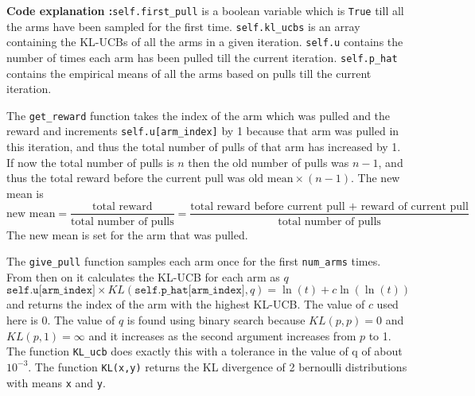 \documentclass[11pt]{article}
\begin{document}
    \noindent
    \textbf{Code explanation :}\texttt{self.first\_pull} is a boolean variable
    which is \texttt{True} till all the arms have been sampled for the first time.
     \texttt{self.kl\_ucbs} is an array containing
    the KL-UCBs of all the arms in a given iteration. \texttt{self.u} contains
    the number of times each arm has been pulled till the current iteration. 
    \texttt{self.p\_hat} contains the empirical means of all the arms
    based on pulls till the current iteration. 

    
    \noindent The \texttt{get\_reward} function
    takes the index of the arm which was pulled and the reward and increments 
    \texttt{self.u[arm\_index]} by 1 because that arm was pulled in this iteration, 
    and thus the total number of pulls of that arm has increased by 1. 
    If now the total number of pulls is $n$ then the old number of pulls was
    $n-1$, and thus the total reward before the current pull was 
    $\text{old mean}\times(n-1)$. The new mean is 
    $$\text{new mean} = \frac{\text{total reward}}{\text{total number of pulls}} = \frac{\text{total reward before current pull + reward of current pull}}{\text{total number of pulls}}$$
    The new mean is set for the arm that was pulled.

   \noindent The \texttt{give\_pull} function samples each arm once for the first \texttt{num\_arms} times. 
    From then on it calculates the KL-UCB for each arm as $q$ 
    $$\texttt{self.u[arm\_index]}\times KL(\texttt{self.p\_hat[arm\_index]}, q) = \ln(t) + c \ln(\ln(t))$$ and returns 
    the index of the arm with the highest KL-UCB. The value of $c$ used here is 0. The value of $q$ is
    found using binary search because $KL(p,p) = 0$ and $KL(p,1) = \infty$ and it increases as the second argument increases
    from $p$ to 1. The function \texttt{KL\_ucb} does exactly this with a tolerance in the value of q 
    of about $10^{-3}$. The function \texttt{KL(x,y)} returns the KL divergence of 2 bernoulli distributions 
    with means \texttt{x} and \texttt{y}.
\end{document}
